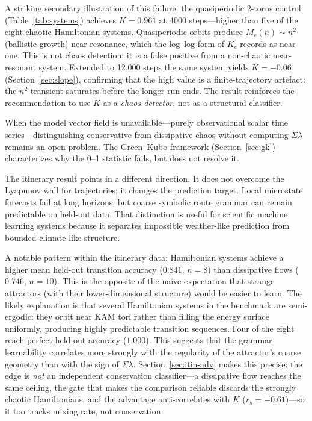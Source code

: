 \documentclass[aip,cha,preprint,amsmath,amssymb,floatfix]{revtex4-2}
\begin{document}
A striking secondary illustration of this failure: the quasiperiodic 2-torus
control (Table~\ref{tab:systems}) achieves $K=0.961$ at 4000 steps---higher than
five of the eight chaotic Hamiltonian systems. Quasiperiodic orbits produce
$M_c(n)\sim n^2$ (ballistic growth) near resonance, which the log--log form of
$K_c$ records as near-one. This is not chaos detection; it is a false positive
from a non-chaotic near-resonant system. Extended to 12,000 steps the same system
yields $K=-0.06$ (Section~\ref{sec:slope}), confirming that the high value is a
finite-trajectory artefact: the $n^2$ transient saturates before the longer
run ends. The result reinforces the recommendation to use $K$ as a \emph{chaos
detector}, not as a structural classifier.

When the model vector field is unavailable---purely observational scalar time
series---distinguishing conservative from dissipative chaos without computing
$\Sigma\lambda$ remains an open problem. The Green--Kubo framework (Section~\ref{sec:gk})
characterizes why the 0--1 statistic fails, but does not resolve it.

The itinerary result points in a different direction. It does not overcome the
Lyapunov wall for trajectories; it changes the prediction target. Local microstate
forecasts fail at long horizons, but coarse symbolic route grammar can remain
predictable on held-out data. That distinction is useful for scientific machine
learning systems because it separates impossible weather-like prediction from
bounded climate-like structure.

A notable pattern within the itinerary data: Hamiltonian systems achieve a higher
mean held-out transition accuracy ($0.841$, $n=8$) than dissipative flows ($0.746$,
$n=10$). This is the opposite of the naive expectation that strange attractors (with
their lower-dimensional structure) would be easier to learn. The likely explanation
is that several Hamiltonian systems in the benchmark are semi-ergodic: they orbit
near KAM tori rather than filling the energy surface uniformly, producing highly
predictable transition sequences. Four of the eight reach perfect held-out accuracy
($1.000$). This suggests that the grammar learnability correlates more strongly with
the regularity of the attractor's coarse geometry than with the sign of $\Sigma\lambda$.
Section~\ref{sec:itin-adv} makes this precise: the edge is \emph{not} an independent
conservation classifier---a dissipative flow reaches the same ceiling, the gate that
makes the comparison reliable discards the strongly chaotic Hamiltonians, and the
advantage anti-correlates with $K$ ($r_s=-0.61$)---so it too tracks mixing rate,
not conservation.
\end{document}
